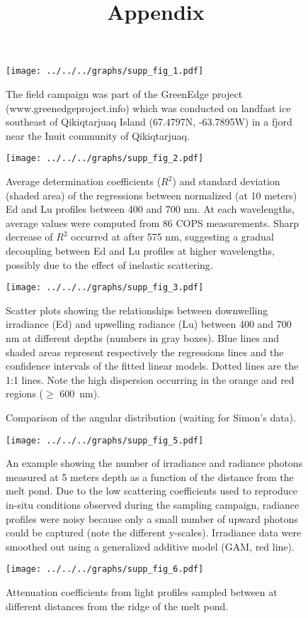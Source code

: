 \documentclass[12pt,a4paper]{scrartcl}
\title{Appendix}
\date{}
\begin{document}
\maketitle

\begin{figure}[h]
	\centering
	\texttt{[image: ../../../graphs/supp\_fig\_1.pdf]}
	\caption{The field campaign was part of the GreenEdge project (www.greenedgeproject.info)  which was conducted on landfast ice southeast of Qikiqtarjuaq Island (67.4797N, -63.7895W) in a fjord near the Inuit community of Qikiqtarjuaq.}
\end{figure}

\clearpage
\newpage

\begin{figure}[h]
	\centering
	\texttt{[image: ../../../graphs/supp\_fig\_2.pdf]}
	\caption{Average determination coefficients ($R^2$) and standard deviation (shaded area) of the regressions between normalized (at 10 meters) Ed and Lu profiles between 400 and 700 nm. At each wavelengths, average values were computed from 86 COPS measurements. Sharp decrease of $R^2$ occurred at after 575 nm, suggesting a gradual decoupling between Ed and Lu profiles at higher wavelengths, possibly due to the effect of inelastic scattering.}
\end{figure}

\clearpage
\newpage

\begin{figure}[h]
	\centering
	\texttt{[image: ../../../graphs/supp\_fig\_3.pdf]}
	\caption{Scatter plots showing the relationships between downwelling irradiance (Ed) and upwelling radiance (Lu) between 400 and 700 nm at different depths (numbers in gray boxes). Blue lines and shaded areas represent respectively the regressions lines and the confidence intervals of the fitted linear models. Dotted lines are the 1:1 lines. Note the high dispersion occurring in the orange and red regions ($\ge$ 600~nm).}
\end{figure}

\clearpage
\newpage

\begin{figure}[h]
	\centering
	\caption{Comparison of the angular distribution (waiting for Simon's data).}
\end{figure}

\clearpage
\newpage

\begin{figure}[h]
	\centering
	\texttt{[image: ../../../graphs/supp\_fig\_5.pdf]}
	\caption{An example showing the number of irradiance and radiance photons measured at 5 meters depth as a function of the distance from the melt pond. Due to the low scattering coefficients used to reproduce in-situ conditions observed during the sampling campaign, radiance profiles were noisy because only a small number of upward photons could be captured (note the different y-scales). Irradiance data were smoothed out using a generalized additive model (GAM, red line).}
\end{figure}

\clearpage
\newpage
	
\begin{figure}[h]
	\centering
	\texttt{[image: ../../../graphs/supp\_fig\_6.pdf]}
	\caption{Attenuation coefficients from light profiles sampled between at different distances from the ridge of the melt pond.}
\end{figure}
\end{document}
